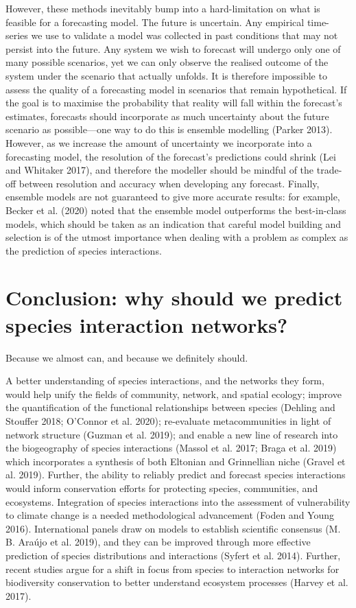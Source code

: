 \documentclass[11pt]{article}
\begin{document}
However, these methods inevitably bump into a hard-limitation on what is
feasible for a forecasting model. The future is uncertain. Any empirical
time-series we use to validate a model was collected in past conditions
that may not persist into the future. Any system we wish to forecast
will undergo only one of many possible scenarios, yet we can only
observe the realised outcome of the system under the scenario that
actually unfolds. It is therefore impossible to assess the quality of a
forecasting model in scenarios that remain hypothetical. If the goal is
to maximise the probability that reality will fall within the forecast's
estimates, forecasts should incorporate as much uncertainty about the
future scenario as possible---one way to do this is ensemble modelling
(Parker 2013). However, as we increase the amount of uncertainty we
incorporate into a forecasting model, the resolution of the forecast's
predictions could shrink (Lei and Whitaker 2017), and therefore the
modeller should be mindful of the trade-off between resolution and
accuracy when developing any forecast. Finally, ensemble models are not
guaranteed to give more accurate results: for example, Becker et al.
(2020) noted that the ensemble model outperforms the best-in-class
models, which should be taken as an indication that careful model
building and selection is of the utmost importance when dealing with a
problem as complex as the prediction of species interactions.

\hypertarget{conclusion-why-should-we-predict-species-interaction-networks}{%
\section{Conclusion: why should we predict species interaction
networks?}\label{conclusion-why-should-we-predict-species-interaction-networks}}

Because we almost can, and because we definitely should.

A better understanding of species interactions, and the networks they
form, would help unify the fields of community, network, and spatial
ecology; improve the quantification of the functional relationships
between species (Dehling and Stouffer 2018; O'Connor et al. 2020);
re-evaluate metacommunities in light of network structure (Guzman et al.
2019); and enable a new line of research into the biogeography of
species interactions (Massol et al. 2017; Braga et al. 2019) which
incorporates a synthesis of both Eltonian and Grinnellian niche (Gravel
et al. 2019). Further, the ability to reliably predict and forecast
species interactions would inform conservation efforts for protecting
species, communities, and ecosystems. Integration of species
interactions into the assessment of vulnerability to climate change is a
needed methodological advancement (Foden and Young 2016). International
panels draw on models to establish scientific consensus (M. B. Araújo et
al. 2019), and they can be improved through more effective prediction of
species distributions and interactions (Syfert et al. 2014). Further,
recent studies argue for a shift in focus from species to interaction
networks for biodiversity conservation to better understand ecosystem
processes (Harvey et al. 2017).
\end{document}
